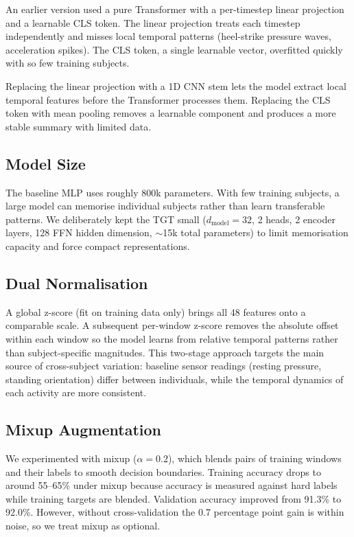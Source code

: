 \documentclass[11pt,a4paper,twocolumn]{article}
\begin{document}
An earlier version used a pure Transformer with a per-timestep linear projection and a learnable CLS token. The linear projection treats each timestep independently and misses local temporal patterns (heel-strike pressure waves, acceleration spikes). The CLS token, a single learnable vector, overfitted quickly with so few training subjects.

Replacing the linear projection with a 1D CNN stem lets the model extract local temporal features before the Transformer processes them. Replacing the CLS token with mean pooling removes a learnable component and produces a more stable summary with limited data.

\subsection{Model Size}

The baseline MLP uses roughly 800k parameters. With few training subjects, a large model can memorise individual subjects rather than learn transferable patterns. We deliberately kept the TGT small ($d_{\text{model}} = 32$, 2 heads, 2 encoder layers, 128 FFN hidden dimension, ${\sim}$15k total parameters) to limit memorisation capacity and force compact representations.

\subsection{Dual Normalisation}

A global z-score (fit on training data only) brings all 48 features onto a comparable scale. A subsequent per-window z-score removes the absolute offset within each window so the model learns from relative temporal patterns rather than subject-specific magnitudes. This two-stage approach targets the main source of cross-subject variation: baseline sensor readings (resting pressure, standing orientation) differ between individuals, while the temporal dynamics of each activity are more consistent.

\subsection{Mixup Augmentation}

We experimented with mixup ($\alpha = 0.2$), which blends pairs of training windows and their labels to smooth decision boundaries. Training accuracy drops to around 55--65\% under mixup because accuracy is measured against hard labels while training targets are blended. Validation accuracy improved from 91.3\% to 92.0\%. However, without cross-validation the 0.7 percentage point gain is within noise, so we treat mixup as optional.
\end{document}
